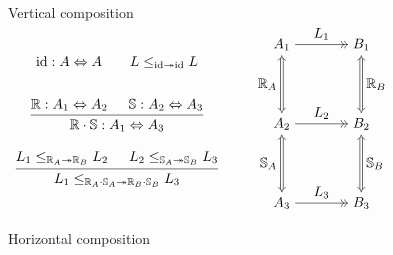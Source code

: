 \documentclass[aspectratio=141]{beamer}
\newcommand{\kw}[1]{\ensuremath{ \mathrm{#1} }}
\begin{document}
\begin{frame}{Vertical composition}
  \centering
  $\begin{array}{c}
    \kw{id} : A \Leftrightarrow A
    \qquad
    L \le_{\kw{id} \twoheadrightarrow \kw{id}} L
    \\[2em]
    {\begin{prooftree}
      \hypo{\mathbb{R} : A_1 \Leftrightarrow A_2}
      \hypo{\mathbb{S} : A_2 \Leftrightarrow A_3}
      \infer2{\mathbb{R} \cdot \mathbb{S} : A_1 \Leftrightarrow A_3}
    \end{prooftree}}
    \\[2em]
    {\begin{prooftree}
      \hypo{L_1 \le_{\mathbb{R}_A \twoheadrightarrow \mathbb{R}_B} L_2}
      \hypo{L_2 \le_{\mathbb{S}_A \twoheadrightarrow \mathbb{S}_B} L_3}
      \infer2{
        L_1 \le_{\mathbb{R}_A \cdot \mathbb{S}_A \twoheadrightarrow
                 \mathbb{R}_B \cdot \mathbb{S}_B} L_3}
    \end{prooftree}}
  \end{array}
  \qquad
  \begin{tikzpicture}[baseline,scale=1]
    \node (A1) at (-1,  2) {$A_1$};
    \node (A2) at (-1,  0) {$A_2$};
    \node (A3) at (-1, -2) {$A_3$};
    \node (B1) at ( 1,  2) {$B_1$};
    \node (B2) at ( 1,  0) {$B_2$};
    \node (B3) at ( 1, -2) {$B_3$};
    \draw (A1) edge[->>] node[auto] {$L_1$} (B1);
    \draw (A2) edge[->>] node[auto] {$L_2$} (B2);
    \draw (A3) edge[->>] node[auto] {$L_3$} (B3);
    \begin{scope}[double equal sign distance, {Implies[]}-{Implies[]}]
      \draw (A1) edge[double] node[auto,swap] {$\mathbb{R}_A$} (A2);
      \draw (B1) edge[double] node[auto] {$\mathbb{R}_B$} (B2);
      \draw (A2) edge[double] node[auto,swap] {$\mathbb{S}_A$} (A3);
      \draw (B2) edge[double] node[auto] {$\mathbb{S}_B$} (B3);
    \end{scope}
  \end{tikzpicture}
  $
\end{frame}

\begin{frame}{Horizontal composition}
\end{frame}
\end{document}
